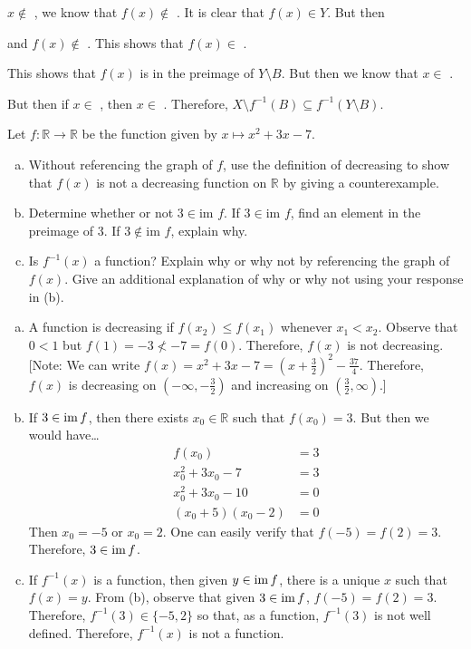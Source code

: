 \documentclass[11pt,letterpaper]{article}
\begin{document}
$x \notin$ , we know that $f(x) \notin$ . It is clear that $f(x) \in Y$. But then \pspace

 and $f(x) \notin$ . This shows that $f(x) \in$ . \pspace

This shows that $f(x)$ is in the preimage of $Y \setminus B$. But then we know that $x \in$ . \pspace

But then if $x \in$ , then $x \in$ . Therefore, $X \setminus f^{-1}(B) \subseteq f^{-1}(Y \setminus B)$.



\newpage



 Let $f: \mathbb{R} \to \mathbb{R}$ be the function given by $x \mapsto x^2 + 3x - 7$. 
	\begin{enumerate}[(a)]
	\item Without referencing the graph of $f$, use the definition of decreasing to show that $f(x)$ is not a decreasing function on $\mathbb{R}$ by giving a counterexample. 
	\item Determine whether or not $3 \in \text{im } f$. If $3 \in \text{im } f$, find an element in the preimage of 3. If $3 \notin \text{im } f$, explain why. 
	\item Is $f^{-1}(x)$ a function? Explain why or why not by referencing the graph of $f(x)$. Give an additional explanation of why or why not using your response in (b). 
	\end{enumerate} \pspace

\sol 
\begin{enumerate}[(a)]
\item A function is decreasing if $f(x_2) \leq f(x_1)$ whenever $x_1 < x_2$. Observe that $0 < 1$ but $f(1)= -3 \not< -7= f(0)$. Therefore, $f(x)$ is not decreasing. [Note: We can write $f(x)= x^2 + 3x - 7= \left(x + \frac{3}{2} \right)^2 - \frac{37}{4}$. Therefore, $f(x)$ is decreasing on $(-\infty, -\frac{3}{2})$ and increasing on $(\frac{3}{2}, \infty)$.] \pspace

\item If $3 \in \operatorname{im} f$, then there exists $x_0 \in \mathbb{R}$ such that $f(x_0)= 3$. But then we would have\dots
	\[
	\begin{aligned}
	f(x_0)&= 3 \\[0.3cm]
	x_0^2 + 3x_0 - 7&= 3 \\[0.3cm]
	x_0^2 + 3x_0 -10&= 0 \\[0.3cm]
	(x_0 + 5)(x_0 - 2)&= 0 
	\end{aligned}
	\]
Then $x_0= -5$ or $x_0= 2$. One can easily verify that $f(-5)= f(2)= 3$. Therefore, $3 \in \operatorname{im} f$. \pspace

\item If $f^{-1}(x)$ is a function, then given $y \in \operatorname{im} f$, there is a unique $x$ such that $f(x)= y$. From (b), observe that given $3 \in \operatorname{im} f$, $f(-5)= f(2)= 3$. Therefore, $f^{-1}(3) \in \{ -5, 2 \}$ so that, as a function, $f^{-1}(3)$ is not well defined. Therefore, $f^{-1}(x)$ is not a function. 
\end{enumerate}
\end{document}

